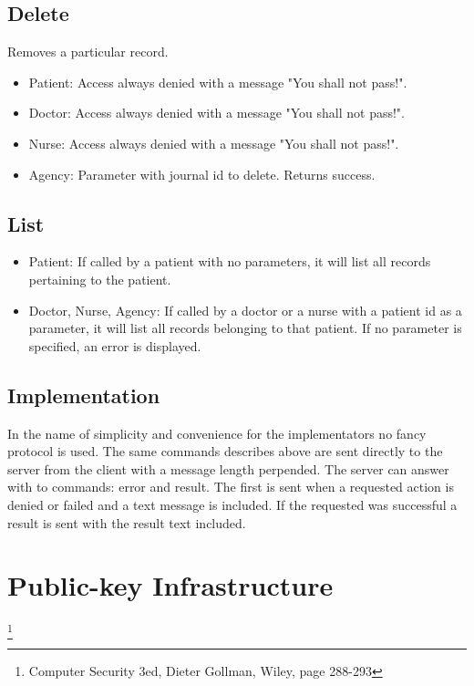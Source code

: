 \documentclass[10pt, a4paper]{article}
\begin{document}
\subsection{Delete}
Removes a particular record.
\begin{itemize}
\item Patient: Access always denied with a message "You shall not pass!".
\item Doctor: Access always denied with a message "You shall not pass!".
\item Nurse: Access always denied with a message "You shall not pass!".
\item Agency: Parameter with journal id to delete. Returns success.
\end{itemize}

\subsection{List}
\begin{itemize}
\item Patient: If called by a patient with no parameters, it will list all records pertaining to the patient.
\item Doctor, Nurse, Agency: If called by a doctor or a nurse with a patient id as a parameter, it will list all records belonging to that patient. If no parameter is specified, an error is displayed.
\end{itemize}

\subsection{Implementation}
In the name of simplicity and convenience for the implementators no fancy protocol is used. The same commands describes above are sent directly to the server from the client with a message length perpended. The server can answer with to commands: error and result. The first is sent when a requested action is denied or failed and a text message is included. If the requested was successful a result is sent with the result text included.

\section{Public-key Infrastructure}
\label{sec+pki}

\footnote{Computer Security 3ed, Dieter Gollman, Wiley, page 288-293}
\end{document}
